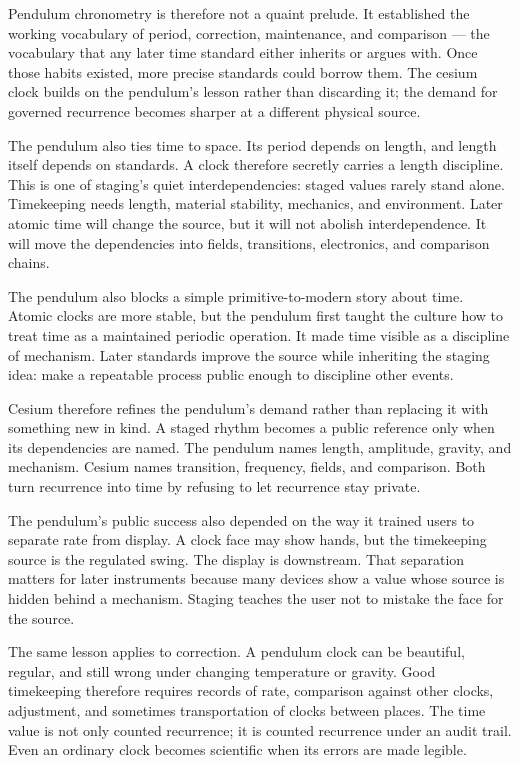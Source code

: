 Pendulum chronometry is therefore not a quaint prelude. It established the
working vocabulary of period, correction, maintenance, and comparison ---
the vocabulary that any later time standard either inherits or argues with.
Once those habits existed, more precise standards could borrow them. The
cesium clock builds on the pendulum's lesson rather than discarding it; the
demand for governed recurrence becomes sharper at a different physical
source.

The pendulum also ties time to space. Its period depends on length, and length
itself depends on standards. A clock therefore secretly carries a length
discipline. This is one of staging's quiet interdependencies: staged
values rarely stand alone. Timekeeping needs length, material stability,
mechanics, and environment. Later atomic time will change the source, but it
will not abolish interdependence. It will move the dependencies into fields,
transitions, electronics, and comparison chains.

The pendulum also blocks a simple primitive-to-modern story about time.
Atomic clocks are more stable, but the pendulum first taught the culture how
to treat time as a maintained periodic operation. It made time visible as a
discipline of mechanism. Later standards improve the source while inheriting
the staging idea: make a repeatable process public enough to discipline
other events.

Cesium therefore refines the pendulum's demand rather than replacing it with
something new in kind. A staged rhythm becomes a public reference only when
its dependencies are named. The pendulum names length, amplitude, gravity,
and mechanism. Cesium names transition, frequency, fields, and comparison.
Both turn recurrence into time by refusing to let recurrence stay private.

The pendulum's public success also depended on the way it trained users to
separate rate from display. A clock face may show hands, but the timekeeping
source is the regulated swing. The display is downstream. That separation
matters for later instruments because many devices show a value whose source
is hidden behind a mechanism. Staging teaches the user not to mistake the face
for the source.

The same lesson applies to correction. A pendulum clock can be beautiful,
regular, and still wrong under changing temperature or gravity. Good
timekeeping therefore requires records of rate, comparison against other
clocks, adjustment, and sometimes transportation of clocks between places.
The time value is not only counted recurrence; it is counted recurrence under
an audit trail. Even an ordinary clock becomes scientific when its errors are
made legible.

